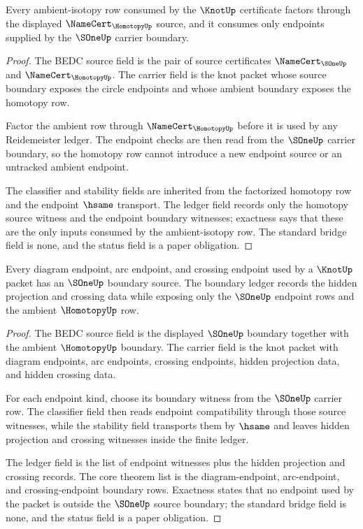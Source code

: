 \begin{theorem}\label{thm:knot-homotopy-source-obligation}
Every ambient-isotopy row consumed by the $\KnotUp$ certificate factors through the displayed $\NameCert_{\HomotopyUp}$ source, and it consumes only endpoints supplied by the $\SOneUp$ carrier boundary.
\end{theorem}

\begin{proof}
The BEDC source field is the pair of source certificates $\NameCert_{\SOneUp}$ and $\NameCert_{\HomotopyUp}$. The carrier field is the knot packet whose source boundary exposes the circle endpoints and whose ambient boundary exposes the homotopy row.

Factor the ambient row through $\NameCert_{\HomotopyUp}$ before it is used by any Reidemeister ledger. The endpoint checks are then read from the $\SOneUp$ carrier boundary, so the homotopy row cannot introduce a new endpoint source or an untracked ambient endpoint.

The classifier and stability fields are inherited from the factorized homotopy row and the endpoint $\hsame$ transport. The ledger field records only the homotopy source witness and the endpoint boundary witnesses; exactness says that these are the only inputs consumed by the ambient-isotopy row. The standard bridge field is none, and the status field is a paper obligation.
\end{proof}

\begin{theorem}\label{thm:knot-sone-boundary-ledger}
Every diagram endpoint, arc endpoint, and crossing endpoint used by a $\KnotUp$ packet has an $\SOneUp$ boundary source. The boundary ledger records the hidden projection and crossing data while exposing only the $\SOneUp$ endpoint rows and the ambient $\HomotopyUp$ row.
\end{theorem}

\begin{proof}
The BEDC source field is the displayed $\SOneUp$ boundary together with the ambient $\HomotopyUp$ boundary. The carrier field is the knot packet with diagram endpoints, arc endpoints, crossing endpoints, hidden projection data, and hidden crossing data.

For each endpoint kind, choose its boundary witness from the $\SOneUp$ carrier row. The classifier field then reads endpoint compatibility through those source witnesses, while the stability field transports them by $\hsame$ and leaves hidden projection and crossing witnesses inside the finite ledger.

The ledger field is the list of endpoint witnesses plus the hidden projection and crossing records. The core theorem list is the diagram-endpoint, arc-endpoint, and crossing-endpoint boundary rows. Exactness states that no endpoint used by the packet is outside the $\SOneUp$ source boundary; the standard bridge field is none, and the status field is a paper obligation.
\end{proof}

